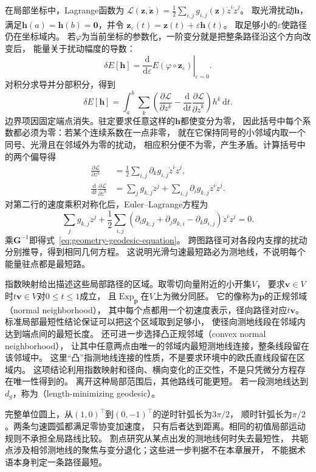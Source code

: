 在局部坐标中，Lagrange函数为
$\mathscr L(\bm z,\dot{\bm z})=\frac12\sum_{i,j}g_{i,j}(\bm z)\dot z^i\dot z^j$。
取光滑扰动$\bm h$，满足$\bm h(a)=\bm h(b)=\bm0$，并令
$\bm z_\varepsilon(t)=\bm z(t)+\varepsilon\bm h(t)$。
取足够小的$\varepsilon$使路径仍在坐标域内。
若$\varphi$为当前坐标的参数化，一阶变分就是把整条路径沿这个方向改变后，
能量关于扰动幅度的导数：
\[
 \delta E[\bm h]
 =\left.\frac{\mathrm d}{\mathrm d\varepsilon}
 E(\varphi\circ\bm z_\varepsilon)\right|_{\varepsilon=0}.
\]
对积分求导并分部积分，得到
\[
 \delta E[\bm h]
 =\int_a^b\sum_k\left(
 \frac{\partial\mathscr L}{\partial z^k}
 -\frac{\mathrm d}{\mathrm dt}
     \frac{\partial\mathscr L}{\partial\dot z^k}\right)h^k\,\mathrm dt.
\]
边界项因固定端点消失。驻定要求任意这样的$\bm h$都使变分为零，
因此括号中每个系数都必须为零：若某个连续系数在一点非零，
就在它保持同号的小邻域内取一个同号、光滑且在邻域外为零的扰动，
相应积分便不为零，产生矛盾。计算括号中的两个偏导得
\[
 \begin{aligned}
 \frac{\partial\mathscr L}{\partial z^k}
   &=\frac12\sum_{i,j}\partial_k g_{i,j}\dot z^i\dot z^j,\\
 \frac{\mathrm d}{\mathrm dt}
    \frac{\partial\mathscr L}{\partial\dot z^k}
   &=\sum_j g_{k,j}\ddot z^j+
     \sum_{i,j}\partial_i g_{k,j}\dot z^i\dot z^j.
 \end{aligned}
\]
对第二行的速度乘积对称化后，Euler--Lagrange方程为
\[
 \sum_jg_{k,j}\ddot z^j+
 \frac12\sum_{i,j}
  (\partial_i g_{k,j}+\partial_j g_{k,i}-\partial_k g_{i,j})
  \dot z^i\dot z^j=0.
\]
乘$\bm G^{-1}$即得式~\eqref{eq:geometry-geodesic-equation}。
跨图路径可对各段内支撑的扰动分别推导，得到相同几何方程。
这说明光滑匀速最短路必为测地线，不说明每个能量驻点都是最短路。

指数映射给出描述这些局部路径的区域。取零切向量附近的小开集$V$，
要求$\bm v\in V$时$t\bm v\in V$对$0\leq t\leq1$成立，
且$\operatorname{Exp}_{\bm p}$在$V$上为微分同胚。
它的像称为$\bm p$的正规邻域（normal neighborhood），
其中每个点都用一个初速度表示，径向路径对应$t\bm v$。
标准局部最短性结论保证可以把这个区域取到足够小，
使径向测地线段在邻域内达到端点间的最短长度。
还可进一步选择凸正规邻域（convex normal neighborhood），
让其中任意两点由唯一的邻域内最短测地线连接，整条线段留在该邻域中。
这里“凸”指测地线连接的性质，不是要求环境中的欧氏直线段留在区域内。
这项结论利用指数映射和径向、横向变化的正交性，不是只凭微分方程存在唯一性得到的。
离开这种局部范围后，其他路线可能更短。
若一段测地线达到$d_g$，称为（length-minimizing geodesic）。

完整单位圆上，从$(1,0)^\top$到$(0,-1)^\top$的逆时针弧长为$3\pi/2$，
顺时针弧长为$\pi/2$。两条匀速圆弧都满足零协变加速度，
只有后者达到距离。相同的初值局部运动规则不承担全局路线比较。
割点研究从某点出发的测地线何时失去最短性，
共轭点涉及相邻测地线的聚焦与变分退化；这些进一步判据不在本章展开，
不能据术语本身判定一条路径最短。

